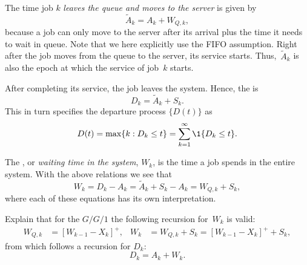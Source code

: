 The time job $k$ \emph{leaves the queue and moves to the server} is given by
\begin{equation*}
 \tilde A_k = A_k + W_{Q,k},
\end{equation*}
because a job can only move to the server after its arrival plus the time it needs to wait in queue.
Note that we here explicitly use the FIFO assumption.
Right after the job moves from the queue to the server, its service starts.
Thus,~$\tilde A_{k}$ is also the epoch at which the service of job~$k$ starts.

After completing its service, the job leaves the system.
Hence, the  is
\begin{equation*}
  D_k = \tilde A_{k} + S_k.
\end{equation*}
This in turn specifies the departure process $\{D(t)\}$ as
\begin{equation*}
  D(t) = \max\{k : D_k \leq t\} = \sum_{k=1}^\infty \1{D_k \leq t}.
\end{equation*}



The , or \emph{waiting time in the system}, $W_k$, is the time a job spends in the entire system.
With the above relations we see that
\begin{equation}
  W_k = D_k - A_k = \tilde A_{k} + S_k -A_k = W_{Q,k} + S_k,
\end{equation}
where each of these equations has its own interpretation. 


\begin{extra}
  Explain that for the $G/G/1$ the following recursion for~$W_k$ is valid:
\begin{align}
  \label{eq:59}
  W_{Q,k} &= [W_{k-1} - X_k]^+, &
  W_{k} &= W_{Q,k} + S_k = [W_{k-1} - X_k]^+ + S_k,
\end{align}
from which follows a recursion for $D_k$:
\begin{equation}
  D_k = A_k + W_k.
\end{equation}
\end{extra}

